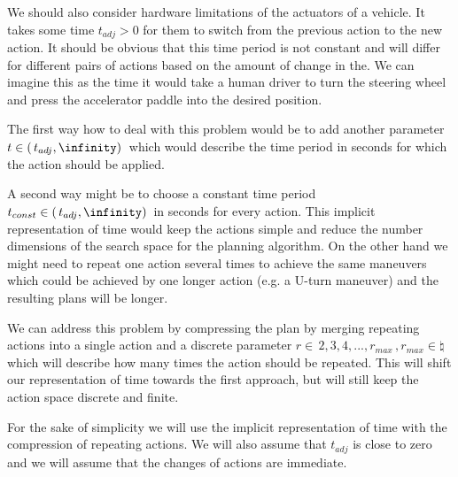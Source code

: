 We should also consider hardware limitations of the actuators of a vehicle. It takes some time $t_{adj} > 0$ for them to switch from the previous action to the new action. It should be obvious that this time period is not constant and will differ for different pairs of actions based on the amount of change in the. We can imagine this as the time it would take a human driver to turn the steering wheel and press the accelerator paddle into the desired position.

The first way how to deal with this problem would be to add another parameter $t \in ( \, t_{adj}, \infinity) \,$ which would describe the time period in seconds for which the action should be applied.

A second way might be to choose a constant time period $t_{const} \in ( \, t_{adj}, \infinity) \,$ in seconds for every action. This implicit representation of time would keep the actions simple and reduce the number dimensions of the search space for the planning algorithm. On the other hand we might need to repeat one action several times to achieve the same maneuvers which could be achieved by one longer action (e.g. a U-turn maneuver) and the resulting plans will be longer.

We can address this problem by compressing the plan by merging repeating actions into a single action and a discrete parameter $r \in { \, 2, 3, 4, ..., r_{max} } \,, r_{max} \in \natural$ which will describe how many times the action should be repeated. This will shift our representation of time towards the first approach, but will still keep the action space discrete and finite.

For the sake of simplicity we will use the implicit representation of time with the compression of repeating actions. We will also assume that $t_{adj}$ is close to zero and we will assume that the changes of actions are immediate.
